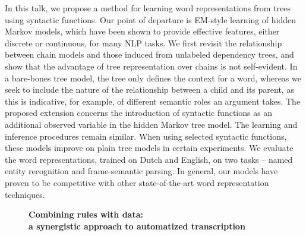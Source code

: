 \documentclass[10pt, a4paper, twopage, headinclude, footinclude, BCOR5mm]{scrartcl}
\begin{document}
{{\begin{table}[t!]
{\begin{tabular}{cc}
        
    \end{tabular} }
    \end{table}
        \begin{table}[t!]
    \end{table}

\noindent
In this talk, we propose a method for learning word representations from trees using syntactic functions. Our point of departure is EM-style learning of hidden Markov models, which have been shown to provide effective features, either discrete or continuous, for many NLP tasks. We first revisit the relationship between chain models and those induced from unlabeled dependency trees, and show that the advantage of tree representation over chains is not self-evident.   In a bare-bones tree model, the tree only defines the context for a word, whereas we seek to include the nature of the relationship between a child and its parent, as this is indicative, for example, of different semantic roles an argument takes.  The proposed extension concerns the introduction of syntactic functions as an additional observed variable in the hidden Markov tree model. The learning and inference procedures remain similar. When using selected syntactic functions, these models improve on plain tree models in certain experiments.  We evaluate the word representations, trained on Dutch and English, on two tasks -- named entity recognition and frame-semantic parsing. In general, our models have proven to be competitive with other state-of-the-art word representation techniques.


\newpage

\begin{figure}[t!]
\centering
\large\textbf{Combining rules with data: \\ a synergistic approach to automatized transcription}
\vspace*{0.5cm}
\end{figure}


        \begin{table}[t!]
\end{table}}}
\end{document}
